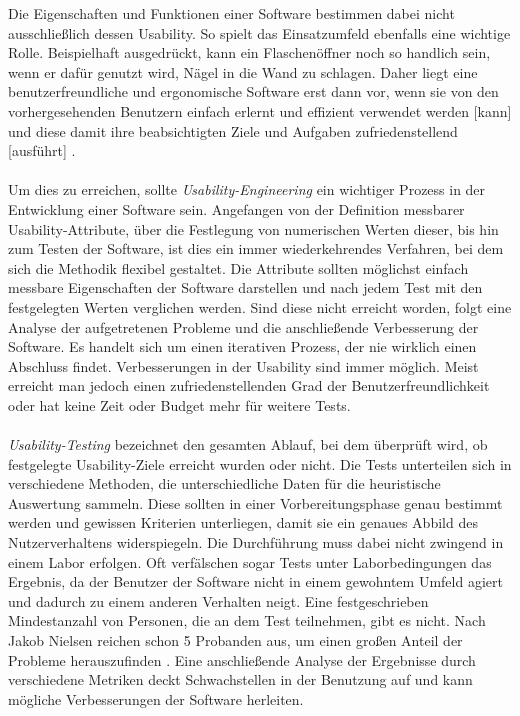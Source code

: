 Die Eigenschaften und Funktionen einer Software bestimmen dabei nicht ausschließlich dessen Usability. So spielt das Einsatzumfeld ebenfalls eine wichtige Rolle. Beispielhaft ausgedrückt, kann ein Flaschenöffner noch so handlich sein, wenn er dafür genutzt wird, Nägel in die Wand zu schlagen. Daher liegt eine benutzerfreundliche und ergonomische Software erst dann vor, wenn \glqq sie von den vorhergesehenden Benutzern einfach erlernt und effizient verwendet werden [kann] und diese damit ihre beabsichtigten Ziele und Aufgaben zufriedenstellend [ausführt]\grqq{} \cite{UsabilityKompakt}.\\
\\
Um dies zu erreichen, sollte \textit{Usability-Engineering} ein wichtiger Prozess in der Entwicklung einer Software sein. Angefangen von der Definition messbarer Usability-Attribute, über die Festlegung von numerischen Werten dieser, bis hin zum Testen der Software, ist dies ein immer wiederkehrendes Verfahren, bei dem sich die Methodik flexibel gestaltet. Die Attribute sollten möglichst einfach messbare Eigenschaften der Software darstellen und nach jedem Test mit den festgelegten Werten verglichen werden. Sind diese nicht erreicht worden, folgt eine Analyse der aufgetretenen Probleme und die anschließende Verbesserung der Software. Es handelt sich um einen iterativen Prozess, der nie wirklich einen Abschluss findet. Verbesserungen in der Usability sind immer möglich. Meist erreicht man jedoch einen zufriedenstellenden Grad der Benutzerfreundlichkeit oder hat keine Zeit oder Budget mehr für weitere Tests.\\
\\
\textit{Usability-Testing} bezeichnet den gesamten Ablauf, bei dem überprüft wird, ob festgelegte Usability-Ziele erreicht wurden oder nicht. Die Tests unterteilen sich in verschiedene Methoden, die unterschiedliche Daten für die heuristische Auswertung sammeln. Diese sollten in einer Vorbereitungsphase genau bestimmt werden und gewissen Kriterien unterliegen, damit sie ein genaues Abbild des Nutzerverhaltens widerspiegeln. Die Durchführung muss dabei nicht zwingend in einem Labor erfolgen. Oft verfälschen sogar Tests unter Laborbedingungen das Ergebnis, da der Benutzer der Software nicht in einem gewohntem Umfeld agiert und dadurch zu einem anderen Verhalten neigt. Eine festgeschrieben Mindestanzahl von Personen, die an dem Test teilnehmen, gibt es nicht. Nach Jakob Nielsen reichen schon 5 Probanden aus, um einen großen Anteil der Probleme herauszufinden \cite{anzahlTestpersonen}. Eine anschließende Analyse der Ergebnisse durch verschiedene Metriken deckt Schwachstellen in der Benutzung auf und kann mögliche Verbesserungen der Software herleiten.\\

